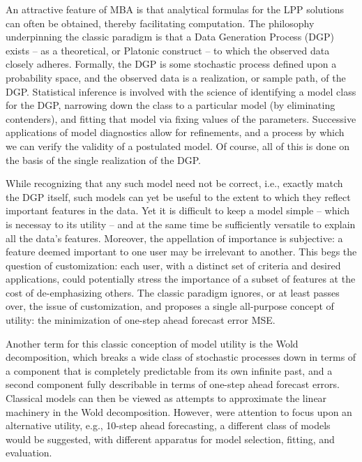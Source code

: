 \documentclass[a4paper]{book}
\begin{document}
An attractive feature of MBA is that analytical formulas for the LPP solutions can often be obtained, thereby
 facilitating computation.  The philosophy underpinning the classic paradigm is that a Data Generation Process (DGP)
 exists -- as a theoretical, or Platonic construct -- to which the observed data closely adheres.  Formally,
 the DGP is some stochastic process defined upon a probability space, and the observed data is a realization, or sample path, of
 the DGP.  Statistical inference is involved with the science of identifying a model class for the DGP, narrowing down
 the class to a particular model (by eliminating contenders), and fitting that model via fixing values of the parameters.
 Successive applications of model diagnostics allow for refinements, and a process by which we can verify the validity
 of a postulated model.  Of course, all of this is done on the basis of the single realization of the DGP.

While recognizing that any such model need not be correct, i.e., exactly match the DGP itself, such models can yet
 be useful to the extent to which they reflect important features in the data.  Yet it is difficult to keep a model
 simple -- which is necessay to its utility -- and at the same time be sufficiently versatile to explain all the 
data's features.  Moreover, the appellation of importance is subjective: a feature deemed important to one user may
 be irrelevant to another.  This begs the question of customization: each user, with a distinct set of criteria and
 desired applications, could potentially stress the importance of a subset of features at the cost of de-emphasizing others.
 The classic paradigm ignores, or at least passes over, the issue of customization, and proposes a single all-purpose
 concept of utility: the minimization of one-step ahead forecast error MSE.

 Another term for this classic conception of model utility is the Wold decomposition, which breaks a wide class of
 stochastic processes down in terms of a component that is completely predictable from its own infinite past, and 
 a second component fully describable in terms of one-step ahead forecast errors.  Classical models can then
 be viewed as attempts to approximate the linear machinery in the Wold decomposition.    However, were attention to
 focus upon an alternative utility, e.g., 10-step ahead forecasting, a different class of models would be suggested,
 with different apparatus for model selection, fitting, and evaluation.
\end{document}
